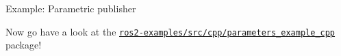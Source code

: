 \begin{frame}{Example: Parametric publisher}
  \begin{block}{}
    \centering
    Now go have a look at the \href{https://github.com/IntelligentSystemsLabUTV/ros2-examples/tree/jazzy/src/cpp/parameters_example_cpp}{\color{blue}\underline{\texttt{ros2-examples/src/cpp/parameters\_example\_cpp}}} package!
  \end{block}
\end{frame}
